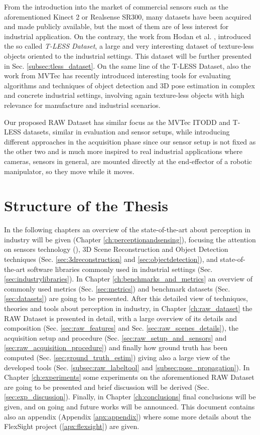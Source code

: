 From the introduction into the market of commercial sensors such as the aforementioned Kinect 2 or Realsense SR300, many datasets have been acquired and made publicly available, but the most of them are of less interest for industrial application. On the contrary, the work from Hodan et al. \cite{hodan2017tless}, introduced the so called \emph{T-LESS Dataset}, a large and very interesting dataset of texture-less objects oriented to the industrial settings. This dataset will be further presented in Sec. \ref{subsec:tless_dataset}. On the same line of the T-LESS Dataset, also the work from MVTec \cite{mvtec2017itodd} has recently introduced interesting tools for evaluating algorithms and techniques of object detection and 3D pose estimation in complex and concrete industrial settings, involving again texture-less objects with high relevance for manufacture and industrial scenarios. 

Our proposed RAW Dataset has similar focus as the MVTec ITODD and T-LESS datasets, similar in evaluation and sensor setups, while introducing different approaches in the acquisition phase since our sensor setup is not fixed as the other two and is much more inspired to real industrial applications where cameras, sensors in general, are mounted directly at the end-effector of a robotic manipulator, so they move while it moves.

\section{Structure of the Thesis}\label{sec:thesisstructure}
In the following chapters an overview of the state-of-the-art about perception in industry will be given (Chapter \ref{ch:perceptionandsensing}), focusing the attention on sensors technology (), 3D Scene Reconstruction and Object Detection techniques (Sec. \ref{sec:3dreconstruction} and \ref{sec:objectdetection}), and state-of-the-art software libraries commonly used in industrial settings (Sec. \ref{sec:industrylibraries}). In Chapter \ref{ch:benchmarks_and_metrics} an overview of commonly used metrics (Sec. \ref{sec:metrics}) and benchmark datasets (Sec. \ref{sec:datasets}) are going to be presented. After this detailed view of techniques, theories and tools about perception in industry, in Chapter \ref{ch:raw_dataset} the RAW Dataset is presented in detail, with a large overview of its details and composition (Sec. \ref{sec:raw_features} and Sec. \ref{sec:raw_scenes_details}), the acquisition setup and procedure (Sec. \ref{sec:raw_setup_and_sensors} and \ref{sec:raw_acquisition_procedure}) and finally how ground truth has been computed (Sec. \ref{sec:ground_truth_estim}) giving also a large view of the developed tools (Sec. \ref{subsec:raw_labeltool} and \ref{subsec:pose_propagation}). In Chapter \ref{ch:experiments} some experiments on the aforementioned RAW Dataset are going to be presented and brief discussion will be derived (Sec. \ref{sec:exp_discussion}). Finally, in Chapter \ref{ch:conclusions} final conclusions will be given, and on going and future works will be announced. This document contains also an appendix (Appendix \ref{apx:appendix}) where some more details about the FlexSight project (\ref{apx:flexsight}) are given.
